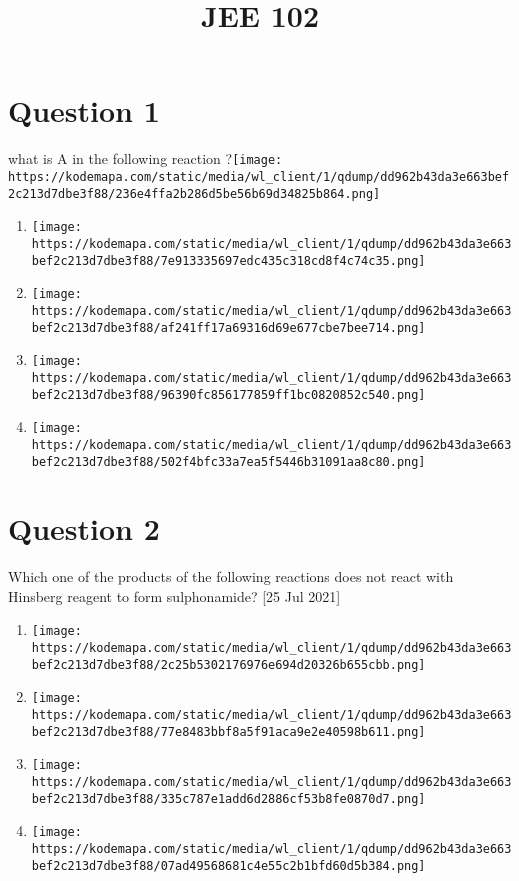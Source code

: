 \documentclass{article}
\title{JEE 102}
\begin{document}
                    \maketitle
                    \section*{Question 1}
what is A in the following reaction ?\texttt{[image: https://kodemapa.com/static/media/wl\_client/1/qdump/dd962b43da3e663bef2c213d7dbe3f88/236e4ffa2b286d5be56b69d34825b864.png]}\newline
\begin{enumerate}[label=(\alph*)]
\item \texttt{[image: https://kodemapa.com/static/media/wl\_client/1/qdump/dd962b43da3e663bef2c213d7dbe3f88/7e913335697edc435c318cd8f4c74c35.png]}
\item \texttt{[image: https://kodemapa.com/static/media/wl\_client/1/qdump/dd962b43da3e663bef2c213d7dbe3f88/af241ff17a69316d69e677cbe7bee714.png]}
\item \texttt{[image: https://kodemapa.com/static/media/wl\_client/1/qdump/dd962b43da3e663bef2c213d7dbe3f88/96390fc856177859ff1bc0820852c540.png]}
\item \texttt{[image: https://kodemapa.com/static/media/wl\_client/1/qdump/dd962b43da3e663bef2c213d7dbe3f88/502f4bfc33a7ea5f5446b31091aa8c80.png]}
\end{enumerate}
\newpage
\section*{Question 2}
Which one of the products of the following reactions does not react with Hinsberg reagent to form sulphonamide? [25 Jul 2021]
\begin{enumerate}[label=(\alph*)]
\item \texttt{[image: https://kodemapa.com/static/media/wl\_client/1/qdump/dd962b43da3e663bef2c213d7dbe3f88/2c25b5302176976e694d20326b655cbb.png]}
\item \texttt{[image: https://kodemapa.com/static/media/wl\_client/1/qdump/dd962b43da3e663bef2c213d7dbe3f88/77e8483bbf8a5f91aca9e2e40598b611.png]}
\item \texttt{[image: https://kodemapa.com/static/media/wl\_client/1/qdump/dd962b43da3e663bef2c213d7dbe3f88/335c787e1add6d2886cf53b8fe0870d7.png]}
\item \texttt{[image: https://kodemapa.com/static/media/wl\_client/1/qdump/dd962b43da3e663bef2c213d7dbe3f88/07ad49568681c4e55c2b1bfd60d5b384.png]}
\end{enumerate}
\newpage
\end{document}
